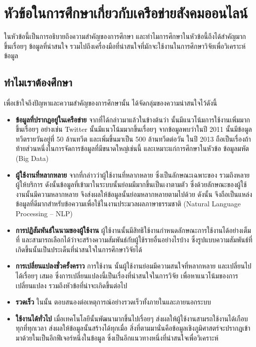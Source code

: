 \section{หัวข้อในการศึกษาเกี่ยวกับเครือข่ายสังคมออนไลน์}
ในหัวข้อนี้เป็นการอธิบายถึงความสำคัญของการศึกษา{\OSN} 
และทำไมการศึกษาในหัวข้อนี้ถึงได้สำคัญมากขึ้นเรื่อยๆ ข้อมูลที่น่าสนใจ 
รวมไปถึงเครื่องมือที่น่าสนใจที่มักจะใช้งานในการศึกษาวิจัยเพื่อวิเคราะห์ข้อมูล{\OSN}

\subsection{ทำไมเราต้องศึกษา{\OSN}}

เพื่อเข้าใจถึงปัญหาและความสำคัญของการศึกษานั้น ได้จัดกลุ่มของความน่าสนใจไว้ดังนี้
\begin{itemize}
    \item \textbf{ข้อมูลที่ปรากฎอยู่ในเครือข่าย} จากที่ได้กล่าวมาแล้วในข้างต้นว่า {\OSN} 
    นั้นมีแนวโน้มการใช้งานเพิ่มมากขึ้นเรื่อยๆ อย่างเช่น Twitter นั้นมีแนวโน้มมากขึ้นเรื่อยๆ 
    จากข้อมูลพบว่าในปี 2011 นั้นมีข้อมูลทวีตรายวันอยู่ที่ 50 ล้านทวีต และเพิ่มขึ้นมาเป็น 
    500 ล้านทวีตต่อวัน ในปี 2013 \cite{web:twitter-usange-statistics}
    ถือเป็นเรื่องถ้าท้ายส่วนหนึ่งในการจัดการข้อมูลที่มีขนาดใหญ่เช่นนี้
    และเหมาะแก่การศึกษาในหัวข้อ ข้อมูลมหัต (Big Data)

    \item \textbf{ผู้ใช้งานที่หลากหลาย} จากที่กล่าวว่าผู้ใช้งานที่หลากหลาย 
    ซึ่งเป็นลักษณะเฉพาะของ{\OSN} รวมถึงหลายผู้ให้บริการ ดังนั้นข้อมูลที่เข้ามาในระบบนั้นย่อมมีมากขึ้นเป็นเงาตามตัว
    ซึ่งด้วยลักษณะของผู้ใช้งานนั้นมีความหลากหลาย จึงส่งผลให้ข้อมูลนั้นย่อมหลากหลายตามไปด้วย
    ดังนั้น{\OSN} จึงถือเป็นแหล่งข้อมูลที่ดีมากสำหรับข้อความเพื่อใช้ในงานประมวลผลภาษาธรรมชาติ 
    (Natural Language Processing -- NLP)

    \item \textbf{การปฏิสัมพันธ์ในนามของผู้ใช้งาน} ผู้ใช้งานนั้นมีสิทธิใช้งานกำหนดลักษณะการใช้งาน{\OSN}ได้อย่างเต็มที่
    และสามารถเลือกได้ว่าจะสร้างความสัมพันธ์กับผู้ใช้รายอื่นอย่างไรบ้าง 
    ซึ่งรูปแบบความสัมพันธ์ที่เกิดขึ้นนั้นเป็นประเด็นที่น่าสนใจในการศึกษาวิจัยได้

    \item \textbf{การเปลี่ยนแปลงชั่วครั้งคราว} การใช้งาน{\OSN} นั้นผู้ใช้งานย่อมมีความสนใจที่หลากหลาย
    และเปลี่ยนไปได้เรื่อยๆ เสมอ ซึ่งการเปลี่ยนแปลงนี้เป็นเรื่องที่น่าสนใจในการวิจัย 
    เพื่อหาแนวโน้มของการเปลี่ยนแปลง รวมถึงหัวข้อที่น่าจะเกิดขึ้นต่อไป

    \item \textbf{รวดเร็ว} ใน{\OSN}นั้น ตอบสนองต่อเหตุการณ์อย่างรวดเร็วทั้งภายในและภายนอกระบบ

    \item \textbf{ใช้งานได้ทั่วไป} เมื่อเทคโนโลยีนั้นพัฒนามากขึ้นไปเรื่อยๆ 
    ส่งผลให้ผู้ใช้งานสามรถใช้งานได้เกือบทุกที่ทุกเวลา ส่งผลให้ข้อมูลนั้นสร้างได้ทุกเมื่อ 
    สิ่งที่ตามมานั่นคือข้อมูลเชิงภูมิศาสตร์จะปรากฎเข้ามาด้วยในเป็นอีกฟีเจอร์หนึ่งในข้อมูล{\OSN} 
    ซึ่งเป็นอีกแนวทางหนึ่งที่น่าสนใจเพื่อวิเคราะห์

\end{itemize}

